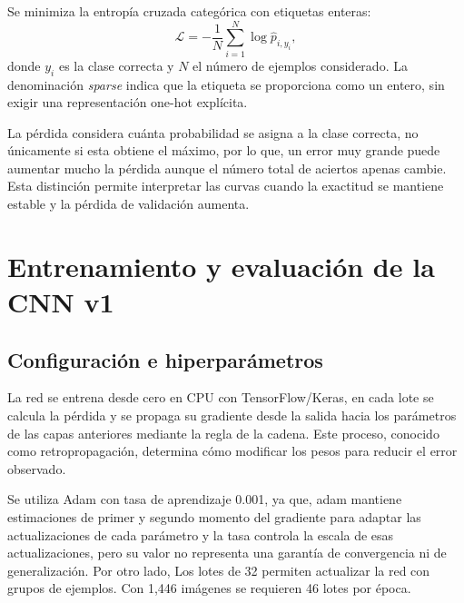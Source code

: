 \documentclass[conference]{IEEEtran}
\begin{document}
Se minimiza la entropía cruzada categórica con etiquetas enteras:
\begin{equation}
\mathcal{L}=-\frac{1}{N}\sum_{i=1}^{N}\log\widehat{p}_{i,y_i},
\label{eq:perdida}
\end{equation}
donde $y_i$ es la clase correcta y $N$ el número de ejemplos considerado. La denominación \textit{sparse} indica que la etiqueta se proporciona como un entero, sin exigir una representación one-hot explícita.

La pérdida considera cuánta probabilidad se asigna a la clase correcta, no únicamente si esta obtiene el máximo, por lo que, un error muy grande puede aumentar mucho la pérdida aunque el número total de aciertos apenas cambie. Esta distinción permite interpretar las curvas cuando la exactitud se mantiene estable y la pérdida de validación aumenta.

\FloatBarrier
\section{Entrenamiento y evaluación de la CNN v1}

\subsection{Configuración e hiperparámetros}

La red se entrena desde cero en CPU con TensorFlow/Keras, en cada lote se calcula la pérdida y se propaga su gradiente desde la salida hacia los parámetros de las capas anteriores mediante la regla de la cadena. Este proceso, conocido como retropropagación, determina cómo modificar los pesos para reducir el error observado.

Se utiliza Adam con tasa de aprendizaje 0.001, ya que, adam mantiene estimaciones de primer y segundo momento del gradiente para adaptar las actualizaciones de cada parámetro \citep{kingma2015} y la tasa controla la escala de esas actualizaciones, pero su valor no representa una garantía de convergencia ni de generalización. Por otro lado, Los lotes de 32 permiten actualizar la red con grupos de ejemplos. Con 1,446 imágenes se requieren 46 lotes por época.
\end{document}
